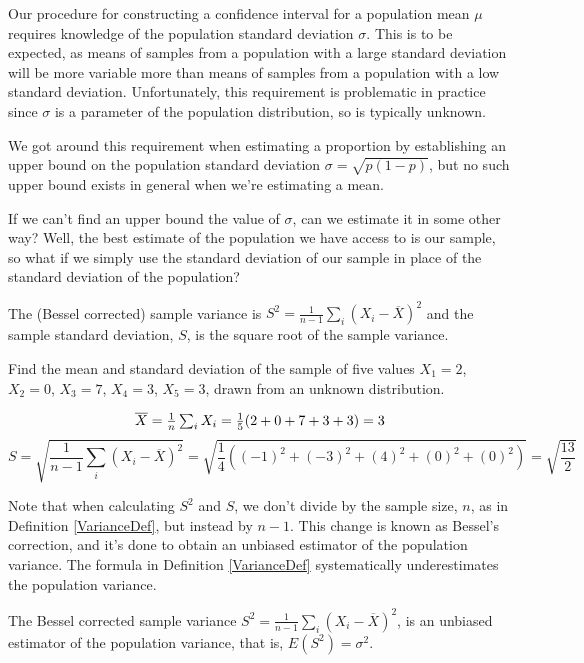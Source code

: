 Our procedure for constructing a confidence interval for a population mean $\mu$ requires knowledge of the population standard deviation $\sigma$. This is to be expected, as means of samples from a population with a large standard deviation will be more variable more than means of samples from a population with a low standard deviation. Unfortunately, this requirement is problematic in practice since $\sigma$ is a parameter of the population distribution, so is typically unknown.
\par
We got around this requirement when estimating a proportion by establishing an upper bound on the population standard deviation $\sigma = \sqrt{p(1-p)}$, but no such upper bound exists in general when we're estimating a mean.
\par
If we can't find an upper bound the value of $\sigma$, can we estimate it in some other way? Well, the best estimate of the population we have access to is our sample, so what if we simply use the standard deviation of our sample in place of the standard deviation of the population?
\par
\begin{defn}\label{SampleStdDev}The (Bessel corrected) sample variance is $S^2 = \frac{1}{n-1}\sum_{i} (X_i - \overline{X})^2$ and the sample standard deviation, $S$, is the square root of the sample variance.
\end{defn}
\par
\begin{examp} Find the mean and standard deviation of the sample of five values $X_1 = 2$, $X_2 = 0$, $X_3 = 7$, $X_4 = 3$, $X_5 = 3$, drawn from an unknown distribution.

$${\overline{X}} = \textstyle\frac{1}{n}\sum_{i} X_i = \frac{1}{5}(2+0+7+3+3) = 3$$
$$S = \textstyle\sqrt{\frac{1}{n-1}\sum_{i} (X_i - \overline{X})^2} = \textstyle\sqrt{\frac{1}{4}((-1)^2+(-3)^2+(4)^2+(0)^2+(0)^2)} = \textstyle\sqrt{\frac{13}{2}}$$
\end{examp}
\par
Note that when calculating $S^2$ and $S$, we don't divide by the sample size, $n$, as in Definition \ref{VarianceDef}, but instead by $n-1$. This change is known as Bessel's correction, and it's done to obtain an unbiased estimator of the population variance. The formula in Definition \ref{VarianceDef} systematically underestimates the population variance.
\begin{thm}The Bessel corrected sample variance $S^2 = \frac{1}{n-1}\sum_{i} (X_i - \overline{X})^2$, is an unbiased estimator of the population variance, that is, $E(S^2) = \sigma^2$.
\end{thm} 
